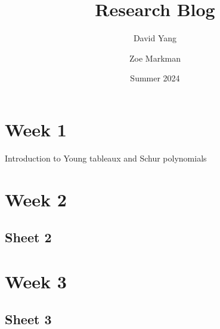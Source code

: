 \documentclass[11pt]{article}
\begin{document}
\title{\textbf{Research Blog}}
\author{David Yang \and Zoe Markman}
\date{Summer 2024}

\maketitle

\section{Week 1}
Introduction to Young tableaux and Schur polynomials

\section{Week 2}


\subsection{Sheet 2}


\newpage

\section{Week 3}


\subsection{Sheet 3}

\end{document}
